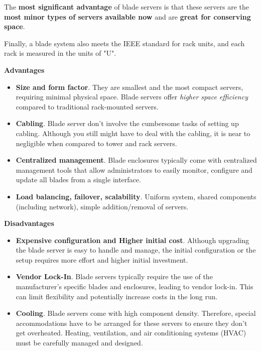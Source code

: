 \documentclass[a4paper]{article}
\newcommand{\highspace}{\vspace{1.2em}\noindent}
\begin{document}
    \highspace
    The \textbf{most significant advantage} of blade servers is that these servers are the \textbf{most minor types of servers available now} and are \textbf{great for conserving space}.

    \highspace
    Finally, a blade system also meets the IEEE standard for rack units, and each rack is measured in the units of "U".

    \begin{flushleft}
        \textcolor{Green3}{ \textbf{Advantages}}
    \end{flushleft}
    \begin{itemize}[label=]
        \item \textbf{Size and form factor}. They are smallest and the most compact servers, requiring minimal physical space. Blade servers offer \emph{higher space efficiency} compared to traditional rack-mounted servers.

        \item \textbf{Cabling}. Blade server don't involve the cumbersome tasks of setting up cabling. Although you still might have to deal with the cabling, it is near to negligible when compared to tower and rack servers.

        \item \textbf{Centralized management}. Blade enclosures typically come with centralized management tools that allow administrators to easily monitor, configure and update all blades from a single interface.

        \item \textbf{Load balancing, failover, scalability}. Uniform system, shared components (including network), simple addition/removal of servers.
    \end{itemize}

    \begin{flushleft}
        \textcolor{Red2}{ \textbf{Disadvantages}}
    \end{flushleft}
    \begin{itemize}[label=]
        \item \textbf{Expensive configuration and Higher initial cost}. Although upgrading the blade server is easy to handle and manage, the initial configuration or the setup requires more effort and higher initial investment.

        \item \textbf{Vendor Lock-In}. Blade servers typically require the use of the manufacturer's specific blades and enclosures, leading to vendor lock-in. This can limit flexibility and potentially increase costs in the long run.

        \item \textbf{Cooling}. Blade servers come with high component density. Therefore, special accommodations have to be arranged for these servers to ensure they don't get overheated. Heating, ventilation, and air conditioning systems (HVAC) must be carefully managed and designed.
    \end{itemize}
\end{document}

